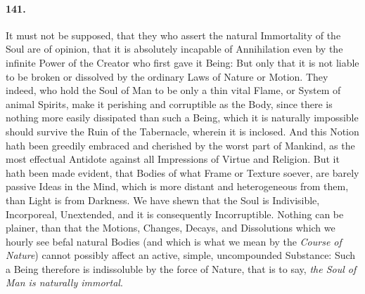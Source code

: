 \documentclass[]{article}
\newenvironment{sectionbody}{\begin{multicols}{2}}{\end{multicols}}
\begin{document}
\begin{sectionbody}
\paragraph{141.} It must not be supposed, that they who assert the natural
Immortality of the Soul are of opinion, that it is absolutely
incapable of Annihilation even by the infinite Power of the
{\sc Creator} who first gave it Being: But only that it is not liable
to be broken or dissolved by the ordinary Laws of Nature or
Motion.  They indeed, who hold the Soul of Man to be only a thin
vital Flame, or System of animal Spirits, make it perishing and
corruptible as the Body, since there is nothing more easily
dissipated than such a Being, which it is naturally impossible
should survive the Ruin of the Tabernacle, wherein it is
inclosed.  And this Notion hath been greedily embraced and
cherished by the worst part of Mankind, as the most effectual
Antidote against all Impressions of Virtue and Religion.  But it
hath been made evident, that Bodies of what Frame or Texture
soever, are barely passive Ideas in the Mind, which is more
distant and heterogeneous from them, than Light is from Darkness.
We have shewn that the Soul is Indivisible, Incorporeal,
Unextended, and it is consequently Incorruptible.  Nothing can be
plainer, than that the Motions, Changes, Decays, and Dissolutions
which we hourly see befal natural Bodies (and which is what we
mean by the \emph{Course of Nature}) cannot possibly affect an
active, simple, uncompounded Substance: Such a Being therefore is
indissoluble by the force of Nature, that is to say, \emph{the Soul
of Man is naturally immortal}.




\end{sectionbody}
\end{document}
